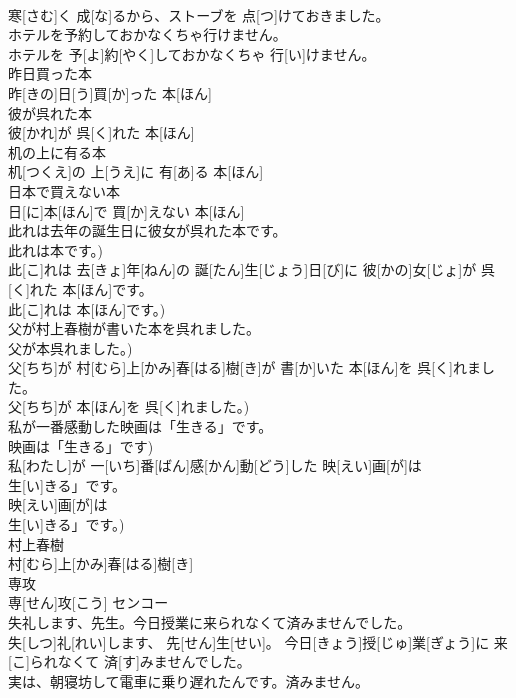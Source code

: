 \documentclass[8pt]{extreport}
\begin{document}
\begin{CJK}{UTF8}{min}
\\	寒[さむ]く 成[な]るから、ストーブを 点[つ]けておきました。
\\	ホテルを予約しておかなくちゃ行けません。	
\\	ホテルを 予[よ]約[やく]しておかなくちゃ 行[い]けません。
\\	昨日買った本	
\\	昨[きの]日[う]買[か]った 本[ほん]
\\	彼が呉れた本	
\\	彼[かれ]が 呉[く]れた 本[ほん]
\\	机の上に有る本	
\\	机[つくえ]の 上[うえ]に 有[あ]る 本[ほん]
\\	日本で買えない本	
\\	日[に]本[ほん]で 買[か]えない 本[ほん]
\\	此れは去年の誕生日に彼女が呉れた本です。 
\\	此れは本です。)	
\\	此[こ]れは 去[きょ]年[ねん]の 誕[たん]生[じょう]日[び]に 彼[かの]女[じょ]が 呉[く]れた 本[ほん]です。 
\\	此[こ]れは 本[ほん]です。)
\\	父が村上春樹が書いた本を呉れました。 
\\	父が本呉れました。)	
\\	父[ちち]が 村[むら]上[かみ]春[はる]樹[き]が 書[か]いた 本[ほん]を 呉[く]れました。 
\\	父[ちち]が 本[ほん]を 呉[く]れました。)
\\	私が一番感動した映画は「生きる」です。 
\\	映画は「生きる」です)	
\\	私[わたし]が 一[いち]番[ばん]感[かん]動[どう]した 映[えい]画[が]は
\\	生[い]きる」です。 
\\	映[えい]画[が]は
\\	生[い]きる」です。)
\\	村上春樹	
\\	村[むら]上[かみ]春[はる]樹[き]	
\\	専攻	
\\	専[せん]攻[こう]	センコー
\\	失礼します、先生。今日授業に来られなくて済みませんでした。	
\\	失[しつ]礼[れい]します、 先[せん]生[せい]。 今日[きょう]授[じゅ]業[ぎょう]に 来[こ]られなくて 済[す]みませんでした。
\\	実は、朝寝坊して電車に乗り遅れたんです。済みません。	

\end{CJK}
\end{document}
